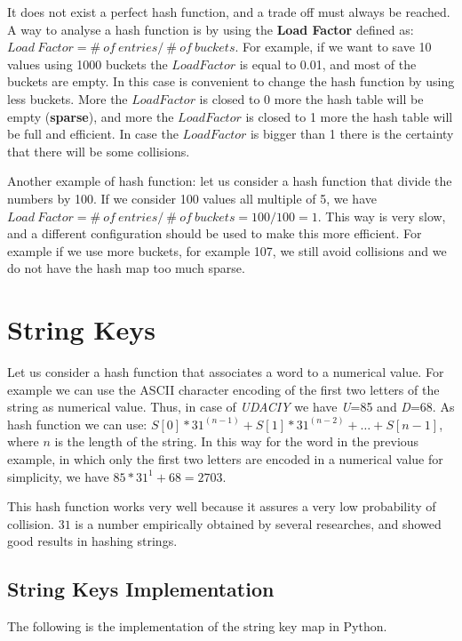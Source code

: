 It does not exist a perfect hash function, and a trade off must always be reached. A way to analyse a hash function is by using the \textbf{Load Factor} defined as: \(Load \ Factor = \# \ of \ entries / \ \# \ of \ buckets\). For example, if we want to save 10 values using 1000 buckets the \(Load Factor\) is equal to 0.01, and most of the buckets are empty. In this case is convenient to change the hash function by using less buckets. More the \(Load Factor\) is closed to 0 more the hash table will be empty (\textbf{sparse}), and more the \(Load Factor\) is closed to 1 more the hash table will be full and efficient. In case the \(Load Factor\) is bigger than 1 there is the certainty that there will be some collisions.

Another example of hash function: let us consider a hash function that divide the numbers by 100. If we consider 100 values all multiple of 5, we have \(Load \ Factor = \# \ of \ entries / \ \# \ of \ buckets = 100/100 = 1\). This way is very slow, and a different configuration should be used to make this more efficient. For example if we use more buckets, for example 107, we still avoid collisions and we do not have the hash map too much sparse.

\section{String Keys}
Let us consider a hash function that associates a word to a numerical value. For example we can use the ASCII character encoding of the first two letters of the string as numerical value. Thus, in case of \textit{UDACIY} we have \textit{U}=85 and \textit{D}=68. As hash function we can use: \(S\left[0\right] * 31^{(n-1)} + S\left[1\right] * 31^{(n-2)} + \ldots + S\left[n-1\right]\), where \(n\) is the length of the string. In this way for the word in the previous example, in which only the first two letters are encoded in a numerical value for simplicity, we have \(85*31^{1} + 68 = 2703\).

This hash function works very well because it assures a very low probability of collision. \(31\) is a number empirically obtained by several researches, and showed good results in hashing strings.

\subsection{String Keys Implementation}
The following is the implementation of the string key map in Python.

